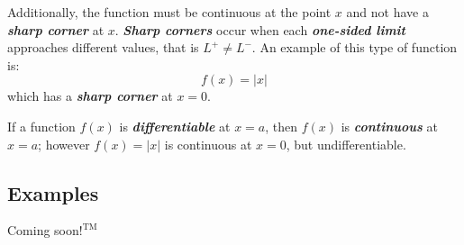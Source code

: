 \vspace{0.1in}
Additionally, the function must be continuous at the point $x$ and not have a \textbf{\textit{sharp corner}} at $x$. \textbf{\textit{Sharp corners}} occur when each \textbf{\textit{one-sided limit}} approaches different values, that is $L^+ \neq L^-$. An example of this type of function is:
\begin{equation}
f(x) = |x|
\end{equation}
which has a \textbf{\textit{sharp corner}} at $x = 0$.

\vspace{0.1in}
If a function $f(x)$ is \textbf{\textit{differentiable}} at $x = a$, then $f(x)$ is \textbf{\textit{continuous}} at $x = a$; however $f(x) = |x|$ is continuous at $x =0$, but undifferentiable.
\begin{center}
\section*{\small Examples}
Coming soon$!^{\text{TM}}$
\end{center}